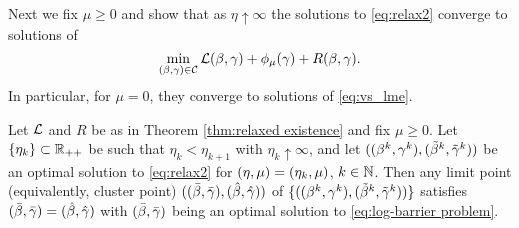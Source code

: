 Next we fix $\mu\ge 0$ and show that as 
$\eta\uparrow\infty$ the solutions to 
\eqref{eq:relax2} converge to solutions of
\begin{equation}\label{eq:log-barrier problem}
\min_{(\beta,\gamma)\in\mathcal{C}}\operatorname{\mathcal{L}}(\beta,\gamma)+\phi_\mu(\gamma)+R(\beta,\gamma).
\end{equation}
In particular, for $\mu=0$, they converge to solutions of 
\eqref{eq:vs_lme}.

\begin{theorem}\label{thm:eta consistency}
Let $\operatorname{\mathcal{L}}$ and $R$ be as in Theorem \ref{thm:relaxed existence}
and fix $\mu\ge 0$.
Let $\{\eta_k\}\subset\operatorname{\mathbb{R}}_{++}$ be such that $\eta_k<\eta_{k+1}$
with $\eta_k\uparrow\infty$, and let $((\beta^k,\gamma^k),(\tilde\beta^k,{\tilde{\gamma}}^k))$ be an optimal solution to 
\eqref{eq:relax2} for $({\eta,\mu})=(\eta_k,\mu)$, $k\in\operatorname{\mathbb{N}}$.
Then any limit point (equivalently, cluster point) 
$((\bar\beta,\bar{\gamma}),(\hat\beta,\hat{\gamma}))$ of $\{((\beta^k,\gamma^k),(\tilde\beta^k,{\tilde{\gamma}}^k))\}$ satisfies
$(\bar\beta,\bar{\gamma})=(\hat\beta,\hat{\gamma})$ with $(\bar\beta,\bar{\gamma})$ being an optimal solution to 
\eqref{eq:log-barrier problem}.
\end{theorem}
